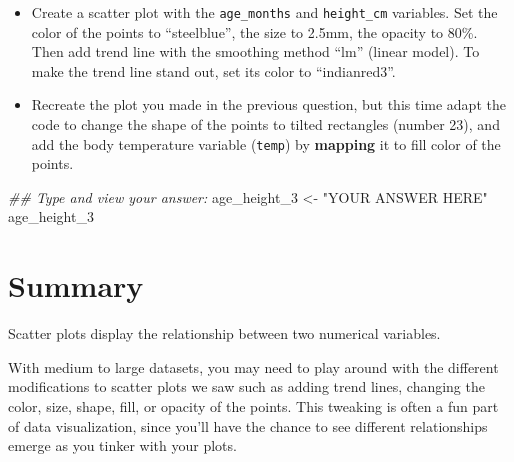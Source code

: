 \documentclass[
  letterpaper,
  DIV=11,
  numbers=noendperiod]{scrreprt}
\newenvironment{Shaded}{\begin{snugshade}}{\end{snugshade}}
\newcommand{\DocumentationTok}[1]{\textcolor[rgb]{0.37,0.37,0.37}{\textit{#1}}}
\newcommand{\NormalTok}[1]{\textcolor[rgb]{0.00,0.23,0.31}{#1}}
\newcommand{\OtherTok}[1]{\textcolor[rgb]{0.00,0.23,0.31}{#1}}
\newcommand{\StringTok}[1]{\textcolor[rgb]{0.13,0.47,0.30}{#1}}
\begin{document}
\begin{tcolorbox}[enhanced jigsaw, colframe=quarto-callout-tip-color-frame, rightrule=.15mm, opacityback=0, breakable, coltitle=black, colbacktitle=quarto-callout-tip-color!10!white, bottomrule=.15mm, leftrule=.75mm, toprule=.15mm, arc=.35mm, bottomtitle=1mm, colback=white, left=2mm, opacitybacktitle=0.6, titlerule=0mm, title=\textcolor{quarto-callout-tip-color}{\faLightbulb}\hspace{0.5em}{Practice}, toptitle=1mm]

\begin{itemize}
\item
  Create a scatter plot with the \texttt{age\_months} and
  \texttt{height\_cm} variables. Set the color of the points to
  ``steelblue'', the size to 2.5mm, the opacity to 80\%. Then add trend
  line with the smoothing method ``lm'' (linear model). To make the
  trend line stand out, set its color to ``indianred3''.
\item
  Recreate the plot you made in the previous question, but this time
  adapt the code to change the shape of the points to tilted rectangles
  (number 23), and add the body temperature variable (\texttt{temp}) by
  \textbf{mapping} it to fill color of the points.
\end{itemize}

\begin{Shaded}
\begin{Highlighting}[]
\DocumentationTok{\#\# Type and view your answer:}
\NormalTok{age\_height\_3 }\OtherTok{\textless{}{-}}  \StringTok{"YOUR ANSWER HERE"}
\NormalTok{age\_height\_3}
\end{Highlighting}
\end{Shaded}

\end{tcolorbox}

\hypertarget{summary}{%
\section{Summary}\label{summary}}

Scatter plots display the relationship between two numerical variables.

With medium to large datasets, you may need to play around with the
different modifications to scatter plots we saw such as adding trend
lines, changing the color, size, shape, fill, or opacity of the points.
This tweaking is often a fun part of data visualization, since you'll
have the chance to see different relationships emerge as you tinker with
your plots.
\end{document}
